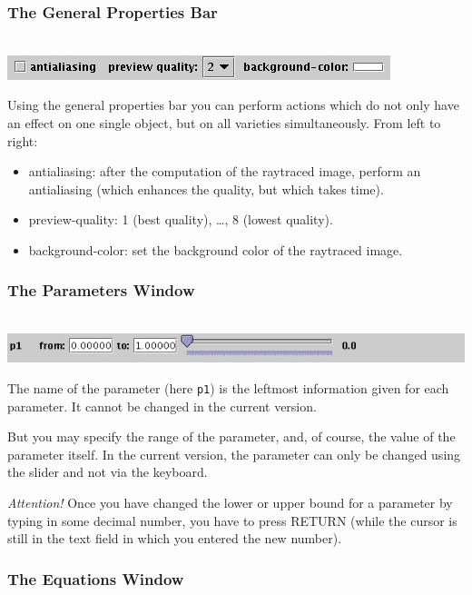 \documentclass{article}
\newcommand{\attention}{\emph{Attention!}}
\begin{document}
\subsubsection{The General Properties Bar}

\ \\\includegraphics[scale=0.6]{surfex_general_prop_bar}

Using the general properties bar you can perform actions which do not
only have an effect on one single object, but on all varieties
simultaneously. 
From left to right:
\begin{itemize}
\item antialiasing: after the computation of the raytraced image, perform an
  antialiasing (which enhances the quality, but which takes time).
\item preview-quality: 1 (best quality), \dots, 8 (lowest quality).
\item background-color: set the background color of the raytraced image.
\end{itemize}


\subsubsection{The Parameters Window}

\ \\\includegraphics[scale=0.5]{surfex_parameters}

The name of the parameter (here {\tt p1}) is the leftmost information given
for each parameter. 
It cannot be changed in the current version. 

But you may specify the range of the parameter, and, of course, the value
of the parameter itself. 
In the current version, the parameter can only be changed using the slider and 
not via the keyboard.

\attention{} 
Once you have changed the lower or upper bound for a
parameter by typing in some decimal number, you have to press RETURN (while
the cursor is still in the text field in which you entered the new number). 


\subsubsection{The Equations Window}
\end{document}
